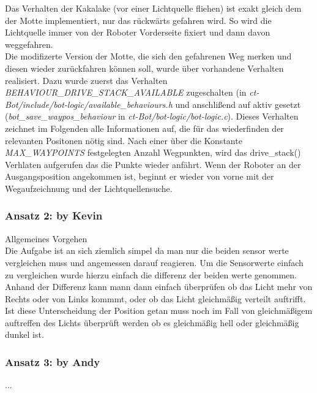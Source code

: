 Das Verhalten der Kakalake (vor einer Lichtquelle fliehen) ist exakt gleich dem der 
Motte implementiert, nur das rückwärts gefahren wird. So wird die Lichtquelle immer
von der Roboter Vorderseite fixiert und dann davon weggefahren. \\

Die modifizerte Version der Motte, die sich den gefahrenen Weg merken und diesen 
wieder zurückfahren können soll, wurde über vorhandene Verhalten realisiert.
Dazu wurde zuerst das Verhalten \textit{BEHAVIOUR\_DRIVE\_STACK\_AVAILABLE} zugeschalten
(in \textit{ct-Bot/include/bot-logic/available\_behaviours.h} und anschlißend
auf aktiv gesetzt (\textit{bot\_save\_waypos\_behaviour} in
\textit{ct-Bot/bot-logic/bot-logic.c}). Dieses Verhalten zeichnet im Folgenden
alle Informationen auf, die für das wiederfinden der relevanten Positonen nötig sind.
Nach einer über die Konstante \textit{MAX\_WAYPOINTS} festgelegten Anzahl Wegpunkten,
wird das drive\_stack() Verhlaten aufgerufen das die Punkte wieder anfährt.
Wenn der Roboter an der Ausgangsposition angekommen ist, beginnt er wieder von vorne mit
der Wegaufzeichnung und der Lichtquellensuche.


\subsubsection{Ansatz 2: by Kevin}

Allgemeines Vorgehen \\
Die Aufgabe ist an sich ziemlich simpel da man nur die beiden sensor werte vergleichen muss und angemessen darauf reagieren.
Um die Sensorwerte einfach zu vergleichen wurde hierzu einfach die differenz der beiden werte genommen.
Anhand der Differenz kann mann dann einfach überprüfen ob das Licht mehr von Rechts oder von Links kommmt, oder ob das Licht gleichmäßig verteilt auftrifft.
Ist diese Unterscheidung der Position getan muss noch im Fall von gleichmäßigem auftreffen des Lichts überprüft werden ob es gleichmäßig hell oder gleichmäßig dunkel ist.



\subsubsection{Ansatz 3: by Andy}
...
